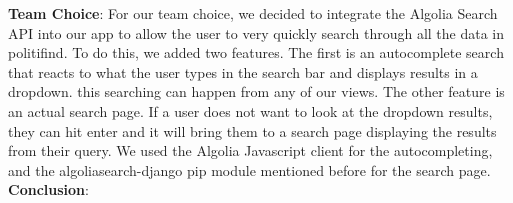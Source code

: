 \documentclass{article}
\newcommand{\n}{\noindent}
\begin{document}
\n\textbf{Team Choice}: For our team choice, we decided to integrate the Algolia Search API into our app to allow the user to very quickly search through all the data in politifind. To do this, we added two features. The first is an autocomplete search that reacts to what the user types in the search bar and displays results in a dropdown. this searching can happen from any of our views. The other feature is an actual search page. If a user does not want to look at the dropdown results, they can hit enter and it will bring them to a search page displaying the results from their query. We used the Algolia Javascript client for the autocompleting, and the algoliasearch-django pip module mentioned before for the search page. \\

\n\textbf{Conclusion}: \\
\end{document}

